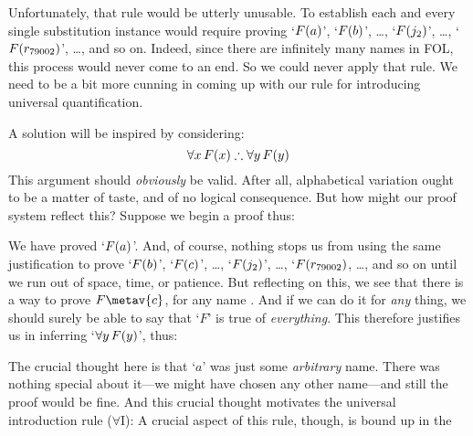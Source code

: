 Unfortunately, that rule would be utterly unusable. To establish each and every single substitution instance would require proving `$\mathord{F}(a)$', `$\mathord{F}(b)$', \dots, `$\mathord{F}(j_2)$', \dots, `$\mathord{F}(r_{79002})$', \ldots, and so on. Indeed, since there are infinitely many names in FOL, this process would never come to an end. So we could never apply that rule. We need to be a bit more cunning in coming up with our rule for introducing universal quantification.

A solution will be inspired by considering:
$$\forall x\,\atom{F}{x} \therefore \forall y\,\atom{F}{y}$$
This argument should \emph{obviously} be valid. After all, alphabetical variation ought to be a matter of taste, and of no logical consequence. But how might our proof system reflect this? Suppose we begin a proof thus:
\begin{fitchproof}
	 \PR
	 
\end{fitchproof}
We have proved `$\mathord{F}(a)$'. And, of course, nothing stops us from using the same justification to prove `$\mathord{F}(b)$', `$\mathord{F}(c)$', \ldots, `$\mathord{F}(j_2)$', \ldots, `$\mathord{F}(r_{79002})$, \dots, and so on until we run out of space, time, or patience. But reflecting on this, we see that there is a way to prove $F\metav{c}$, for any name . And if we can do it for \emph{any} thing, we should surely be able to say that `$F$' is true of \emph{everything}. This therefore justifies us in inferring `$\forall y\,\mathord{F}(y)$', thus:
\begin{fitchproof}
	\PR
	 
	 
\end{fitchproof}
The crucial thought here is that `$a$' was just some \emph{arbitrary} name. There was nothing special about it---we might have chosen any other name---and still the proof would be fine. And this crucial thought motivates the universal introduction rule ($\forall$I):
A crucial aspect of this rule, though, is bound up in the %
